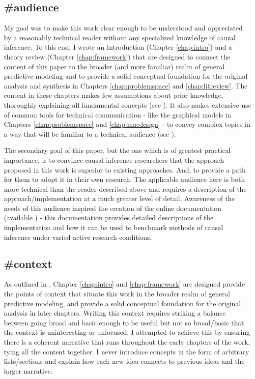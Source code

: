 \documentclass[./main.tex]{subfiles}
\begin{document}

\subsection*{\textbf{\#audience}}
\label{hc:audience}

My goal was to make this work clear enough to be understood and appreciated by a reasonably technical reader without any specialized knowledge of causal inference. To this end, I wrote an Introduction (Chapter \ref{chap:intro}) and a theory review (Chapter \ref{chap:framework}) that are designed to connect the content of this paper to the broader (and more familiar) realm of general predictive modeling and to provide a solid conceptual foundation for the original analysis and synthesis in Chapters \ref{chap:problemspace} and \ref{chap:litreview}. The content in these chapters makes few assumptions about prior knowledge, thoroughly explaining all fundamental concepts (see ). It also makes extensive use of common tools for technical communication - like the graphical models in Chapters \ref{chap:problemspace} and \ref{chap:macdesign} - to convey complex topics in a way that will be familiar to a technical audience (see ).

\vspace{\baselineskip}

The secondary goal of this paper, but the one which is of greatest practical importance, is to convince causal inference researchers that the approach proposed in this work is superior to existing approaches. And, to provide a path for them to adopt it in their own research. The applicable audience here is both more technical than the reader described above and requires a description of the approach/implementation at a much greater level of detail. Awareness of the needs of this audience inspired the creation of the online documentation (available ) - this documentation provides detailed descriptions of the implementation and how it can be used to benchmark methods of causal inference under varied active research conditions.


\subsection*{\textbf{\#context}}
\label{hc:context}

As outlined in , Chapter \ref{chap:intro} and \ref{chap:framework} are designed provide the points of context that situate this work in the broader realm of general predictive modeling, and provide a solid conceptual foundation for the original analysis in later chapters. Writing this context requires striking a balance between going broad and basic enough to be useful but not so broad/basic that the context is uninteresting or unfocused. I attempted to achieve this by ensuring there is a coherent narrative that runs throughout the early chapters of the work, tying all the content together. I never introduce concepts in the form of arbitrary lists/sections and explain how each new idea connects to previous ideas and the larger narrative.
\end{document}
